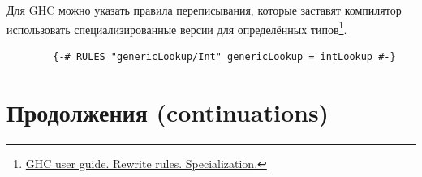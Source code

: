 \documentclass[12pt]{article}
\begin{document}




    \cite{constraint-kind}




    Для GHC можно указать правила переписывания, которые заставят компилятор использовать специализированные версии для определённых типов\footnote{\href{https://downloads.haskell.org/~ghc/6.12.2/docs/html/users\_guide/rewrite-rules.html\#rule-spec}{GHC user guide. Rewrite rules. Specialization.}}.
    \begin{verbatim}
        {-# RULES "genericLookup/Int" genericLookup = intLookup #-}
    \end{verbatim}












    \section{Продолжения (continuations)} \label{sec:continuations}
\end{document}
